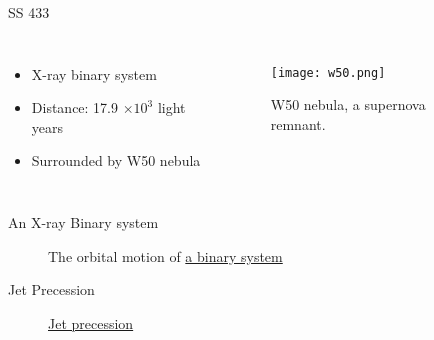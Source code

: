 \documentclass{beamer}
\begin{document}
\begin{frame}{SS 433}
       \begin{columns}
          \begin{itemize}
             \item X-ray binary system
             \item Distance: 17.9 $\times 10^3$ light years
             \item Surrounded by W50 nebula
          \end{itemize}
          \begin{figure}
                \centering
                \texttt{[image: w50.png]}
                \caption{W50 nebula, a supernova remnant.}
                \label{hess}               
                \end{figure}
          \end{columns} 
\end{frame}



\begin{frame}{An X-ray Binary system}
\begin{figure}
  \centering
  \caption{The orbital motion of \href{http://dmaitra.webspace.wheatoncollege.edu/only_orbital_motion.mp4}{a binary system}}
  \label{binary}
\end{figure}
\end{frame}




\begin{frame}{Jet Precession}
\begin{figure}
  \centering
  \caption{\href{http://dmaitra.webspace.wheatoncollege.edu/only_jet_precession.mp4}{Jet precession}}
  \label{jet}
\end{figure}
\end{frame} 


\end{document}
